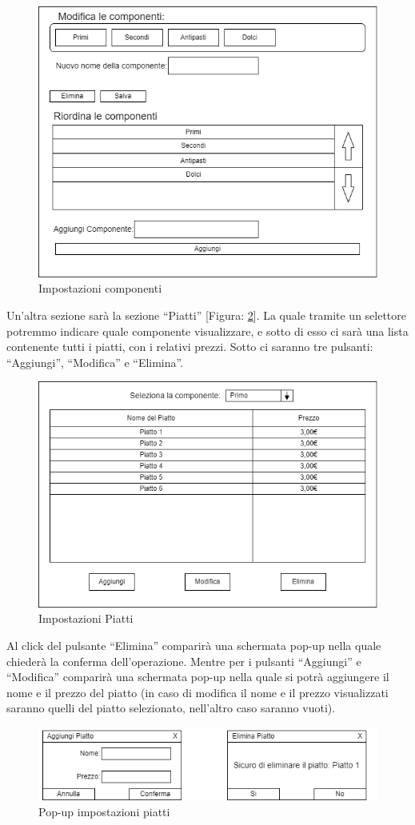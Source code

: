 \documentclass[12pt, letterpaper]{book}
\begin{document}
\begin{figure}[H]
    \centering
    \includegraphics[width = 0.6 \linewidth]{../Documentazione/Drawio/ImpostazioniComponenti.png}
    \caption{Impostazioni componenti}
    \label{ImpostazioniComponenti}
\end{figure}

Un'altra sezione sarà la sezione “Piatti” [Figura: \ref{ImpostazioniPiatti}]. La quale tramite un selettore potremmo indicare quale componente visualizzare, e sotto di esso ci sarà una lista contenente tutti i piatti, con i relativi prezzi. Sotto ci saranno tre pulsanti: “Aggiungi”, “Modifica” e “Elimina”.

\begin{figure}[H]
    \centering
    \includegraphics[width = 0.6 \linewidth]{../Documentazione/Drawio/ImpostazioniPiatti.png}
    \caption{Impostazioni Piatti}
    \label{ImpostazioniPiatti}
\end{figure}

Al click del pulsante “Elimina” comparirà una schermata pop-up nella quale chiederà la conferma dell'operazione. Mentre per i pulsanti “Aggiungi” e “Modifica” comparirà una schermata pop-up nella quale si potrà aggiungere il nome e il prezzo del piatto (in caso di modifica il nome e il prezzo visualizzati saranno quelli del piatto selezionato, nell'altro caso saranno vuoti).

\begin{figure}[H]
    \centering
    \includegraphics[width = 0.8 \linewidth]{../Documentazione/Drawio/AggiungiEliminaPiatto.png}
    \caption{Pop-up impostazioni piatti}
    \label{PopupPiatti}
\end{figure}
\end{document}
